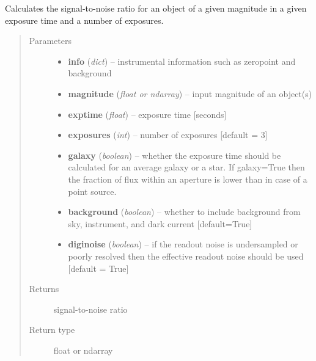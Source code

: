 \documentclass[a4paper,12pt,english]{sphinxmanual}
\begin{document}
\begin{fulllineitems}
\label{ETC:analysis.ETC.SNR}
Calculates the signal-to-noise ratio for an object of a given magnitude in a given exposure time and a
number of exposures.
\begin{quote}\begin{description}
\item[{Parameters}] \leavevmode\begin{itemize}
\item {} 
\textbf{info} (\emph{dict}) -- instrumental information such as zeropoint and background

\item {} 
\textbf{magnitude} (\emph{float or ndarray}) -- input magnitude of an object(s)

\item {} 
\textbf{exptime} (\emph{float}) -- exposure time {[}seconds{]}

\item {} 
\textbf{exposures} (\emph{int}) -- number of exposures {[}default = 3{]}

\item {} 
\textbf{galaxy} (\emph{boolean}) -- whether the exposure time should be calculated for an average galaxy or a star.
If galaxy=True then the fraction of flux within an aperture is lower than in case of a point source.

\item {} 
\textbf{background} (\emph{boolean}) -- whether to include background from sky, instrument, and dark current {[}default=True{]}

\item {} 
\textbf{diginoise} (\emph{boolean}) -- if the readout noise is undersampled or poorly resolved then the effective readout noise
should be used {[}default = True{]}

\end{itemize}

\item[{Returns}] \leavevmode
signal-to-noise ratio

\item[{Return type}] \leavevmode
float or ndarray

\end{description}\end{quote}

\end{fulllineitems}
\end{document}
